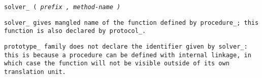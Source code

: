 
\tt{solver_ (} \it{prefix} \tt{,} \it{method-name} \tt{)}


\tt{solver_} gives mangled name of the function defined by
\tt{procedure_}; this function is also declared by \tt{protocol_}.

\note \tt{prototype_} family does not declare the identifier given by \tt{solver_}:
this is because a procedure can be defined with internal linkage, in which
case the function will not be visible outside of its own translation unit.
